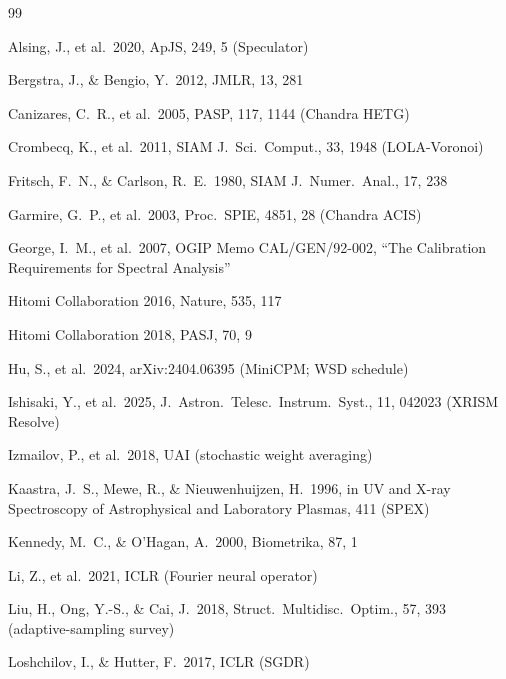 \documentclass[11pt,a4paper]{article}
\begin{document}
\begin{thebibliography}{99}

Alsing, J., et al.\ 2020, ApJS, 249, 5 (Speculator)

Bergstra, J., \& Bengio, Y.\ 2012, JMLR, 13, 281

Canizares, C.~R., et al.\ 2005, PASP, 117, 1144 (Chandra HETG)

Crombecq, K., et al.\ 2011, SIAM J.~Sci.~Comput., 33, 1948
(LOLA-Voronoi)

Fritsch, F.~N., \& Carlson, R.~E.\ 1980, SIAM J.~Numer.~Anal., 17, 238

Garmire, G.~P., et al.\ 2003, Proc.~SPIE, 4851, 28 (Chandra ACIS)

George, I.~M., et al.\ 2007, OGIP Memo CAL/GEN/92-002, ``The
Calibration Requirements for Spectral Analysis''

Hitomi Collaboration 2016, Nature, 535, 117

Hitomi Collaboration 2018, PASJ, 70, 9

Hu, S., et al.\ 2024, arXiv:2404.06395 (MiniCPM; WSD schedule)

Ishisaki, Y., et al.\ 2025, J.~Astron.~Telesc.~Instrum.~Syst., 11,
042023 (XRISM Resolve)

Izmailov, P., et al.\ 2018, UAI (stochastic weight averaging)

Kaastra, J.~S., Mewe, R., \& Nieuwenhuijzen, H.\ 1996, in UV and X-ray
Spectroscopy of Astrophysical and Laboratory Plasmas, 411 (SPEX)

Kennedy, M.~C., \& O'Hagan, A.\ 2000, Biometrika, 87, 1

Li, Z., et al.\ 2021, ICLR (Fourier neural operator)

Liu, H., Ong, Y.-S., \& Cai, J.\ 2018, Struct.~Multidisc.~Optim., 57,
393 (adaptive-sampling survey)

Loshchilov, I., \& Hutter, F.\ 2017, ICLR (SGDR)


\end{thebibliography}
\end{document}
